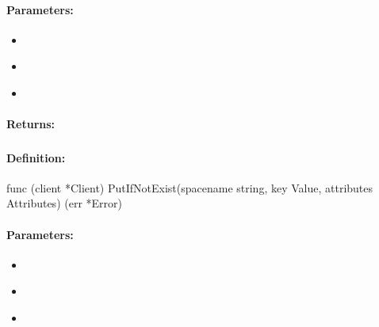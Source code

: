 \paragraph{Parameters:}
\begin{itemize}[noitemsep]
\item {}\\

\item {}\\

\item {}\\

\end{itemize}

\paragraph{Returns:}


\pagebreak
\subsubsection{}
\label{api:Go:PutIfNotExist}


\paragraph{Definition:}
\begin{gocode}
func (client *Client) PutIfNotExist(spacename string, key Value, attributes Attributes) (err *Error)
\end{gocode}

\paragraph{Parameters:}
\begin{itemize}[noitemsep]
\item {}\\

\item {}\\

\item {}\\

\end{itemize}

